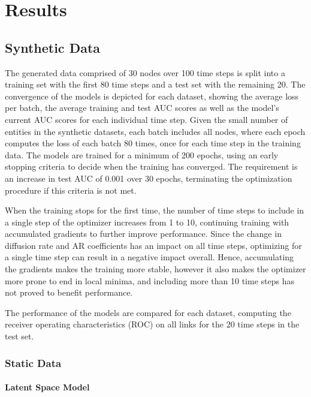 \chapter{Results}\label{ch:Results}

\section{Synthetic Data}

The generated data comprised of 30 nodes over 100 time steps is split into a training set with the first 80 time steps and a test set with the remaining 20. The convergence of the models is depicted for each dataset, showing the average loss per batch, the average training and test AUC scores as well as the model's current AUC scores for each individual time step. Given the small number of entities in the synthetic datasets, each batch includes all nodes, where each epoch computes the loss of each batch 80 times, once for each time step in the training data. The models are trained for a minimum of 200 epochs, using an early stopping criteria to decide when the training has converged. The requirement is an increase in test AUC of 0.001 over 30 epochs, terminating the optimization procedure if this criteria is not met. 

When the training stops for the first time, the number of time steps to include in a single step of the optimizer increases from 1 to 10, continuing training with accumulated gradients to further improve performance. Since the change in diffusion rate and AR coefficients has an impact on all time steps, optimizing for a single time step can result in a negative impact overall. Hence, accumulating the gradients makes the training more stable, however it also makes the optimizer more prone to end in local minima, and including more than 10 time steps has not proved to benefit performance.

The performance of the models are compared for each dataset, computing the receiver operating characteristics (ROC) on all links for the 20 time steps in the test set.

\subsection{Static Data}

    \subsubsection{Latent Space Model}
    
